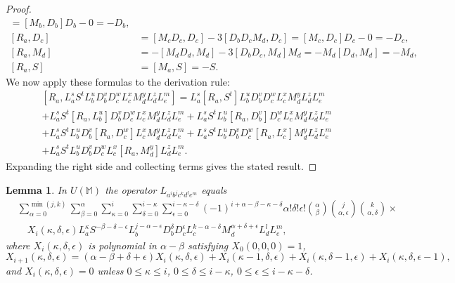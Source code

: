 \documentclass{amsart}
\theoremstyle{plain}
\newtheorem{lemma}{Lemma}[section]
\theoremstyle{definition}
\begin{document}
\begin{proof}
\begin{align*}
  =
  [ M_b, D_b ] D_b - 0
  =
  - D_b,
  \\
  [ R_a, D_c ]
  &=
  [ M_c D_c, D_c ] - 3 [ D_b D_c M_d, D_c ]
  =
  [ M_c, D_c ] D_c - 0
  =
  - D_c,
  \\
  [ R_a, M_d ]
  &=
  - [ M_d D_d, M_d ] - 3 [ D_b D_c, M_d ] M_d
  =
  - M_d [ D_d, M_d ]
  =
  - M_d,
  \\
  [ R_a, S ]
  &=
  [ M_a, S ]
  =
  - S.
  \end{align*}
We now apply these formulas to the derivation rule:
  \allowdisplaybreaks
  \begin{align*}
  &
  [ R_a, L_a^s S^t L_b^u D_b^v D_c^w L_c^x M_d^y L_d^z L_e^m]
  =
  L_a^s [R_a, S^t] L_b^u D_b^v D_c^w L_c^x M_d^y L_d^z L_e^m
  \\
  &
  +
  L_a^s S^t [R_a, L_b^u] D_b^v D_c^w L_c^x M_d^y L_d^z L_e^m
  +
  L_a^s S^t  L_b^u [R_a,  D_b^v] D_c^w L_c^x M_d^y L_d^z L_e^m
  \\
  &
  +
  L_a^s S^t L_b^u D_b^v [R_a, D_c^w] L_c^x M_d^y L_d^z L_e^m
  +
  L_a^s  S^t L_b^u D_b^v D_c^w [R_a, L_c^x] M_d^y L_d^z L_e^m
  \\
  &
  +
  L_a^s  S^t L_b^u D_b^v D_c^w L_c^x [R_a, M_d^y] L_d^z L_e^m.
  \end{align*}
Expanding the right side and collecting terms gives the stated result.
\end{proof}

\begin{lemma}\label{abcde-operator}
In $U(\mathbb{M})$ the operator $L_{a^i b^j c^k d^l e^m}$ equals
  \allowdisplaybreaks
  \begin{align*}
  &
  \sum_{\alpha=0}^{\min(j,k)}
  \sum_{\beta=0}^{\alpha}
  \sum_{\kappa=0}^i
  \sum_{\delta=0}^{i-\kappa}
  \sum_{\epsilon=0}^{i-\kappa-\delta}
  (-1)^{i+\alpha-\beta-\kappa-\delta}
  \alpha! \delta! \epsilon!
  \binom{\alpha}{\beta}
  \binom{j}{\alpha,\epsilon}
  \binom{k}{\alpha,\delta}
  \times
  \\
  &\quad
  X_i(\kappa, \delta, \epsilon)
  L_a^{\kappa}
  S^{-\beta-\delta-\epsilon}
  L_b^{j-\alpha-\epsilon}
  D_b^{\delta}
  D_c^{\epsilon}
  L_c^{k-\alpha-\delta}
  M_d^{\alpha+\delta+\epsilon}
  L_d^l
  L_e^m,
  \end{align*}
where $X_i(\kappa, \delta, \epsilon)$ is  polynomial in $\alpha-\beta$
satisfying $X_0(0,0,0) = 1$,
  \[
  X_{i+1}(\kappa,\delta,\epsilon)
  =
  (\alpha{-}\beta{+}\delta{+}\epsilon) X_i(\kappa,\delta,\epsilon)
  +
  X_i(\kappa{-}1,\delta,\epsilon)
  +
  X_i(\kappa,\delta{-}1,\epsilon)
  +
  X_i(\kappa,\delta,\epsilon{-}1),
  \]
and $X_i(\kappa,\delta,\epsilon) = 0$ unless $0 \le \kappa \le i$, $0 \le
\delta \le i{-}\kappa$, $0 \le \epsilon \le i{-}\kappa{-}\delta$.
\end{lemma}
\end{document}
